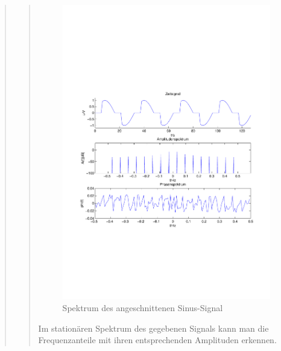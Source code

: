 \begin{quote}
\begin{quote}
        
        \begin{figure}[H]
                    \centering
                        \includegraphics[scale=0.4, trim = 1cm 7cm 1.5cm 8cm,
                        clip]{./Bilder/Termin8/Spektrum}
                        \caption{Spektrum des angeschnittenen Sinus-Signal}
                    \end{figure} 
        
        
        Im stationären Spektrum des gegebenen Signals kann man die
        Frequenzanteile mit ihren entsprechenden Amplituden erkennen.
        

\end{quote}
\end{quote}
